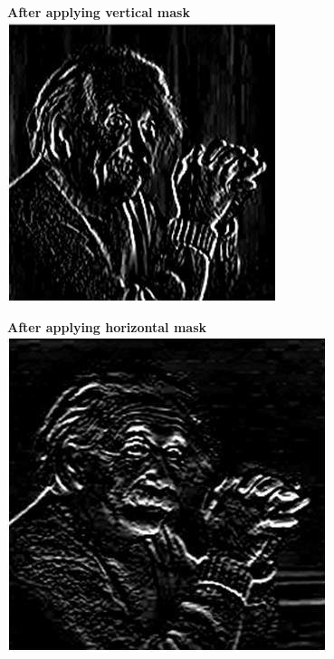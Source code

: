 \documentclass[11pt]{beamer}
\begin{document}
\begin{frame}
\textbf{After applying vertical mask}
\includegraphics{sobel2}
\end{frame}

\begin{frame}
\textbf{After applying horizontal mask}
\includegraphics{sobel3}
\end{frame}
\end{document}
